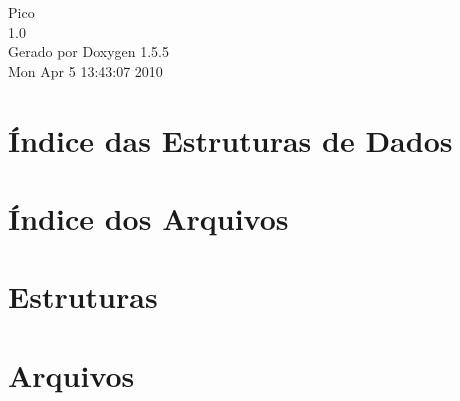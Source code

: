 \documentclass[a4paper]{book}
\begin{document}
\begin{titlepage}
\vspace*{7cm}
\begin{center}
{\Large Pico \\[1ex]\large 1.0 }\\
\vspace*{1cm}
{\large Gerado por Doxygen 1.5.5}\\
\vspace*{0.5cm}
{\small Mon Apr 5 13:43:07 2010}\\
\end{center}
\end{titlepage}
\clearemptydoublepage
{}
\tableofcontents
\clearemptydoublepage
{}
\chapter{Índice das Estruturas de Dados}

\chapter{Índice dos Arquivos}

\chapter{Estruturas}



\chapter{Arquivos}



\printindex
\end{document}
